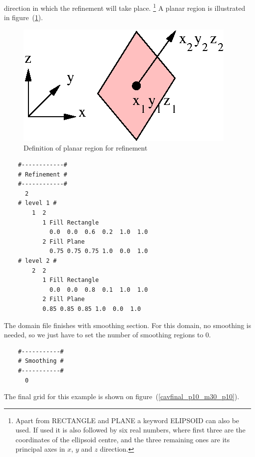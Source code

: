 \documentclass[10pt]{article}
\newcommand*{\tc}{\ttfamily} %
\begin{document}
    direction in which the refinement will take place. 
      \footnote{Apart from {\tc RECTANGLE} and {\tc PLANE} a keyword
      {\tc ELIPSOID} can also be used. If used it is also followed
      by six real numbers, where first three are the coordinates 
      of the ellipsoid centre, and the three remaining ones are 
      its principal axes in $x$, $y$ and $z$ direction.} 
    A planar region is illustrated in figure~(\ref{plane}).
    \begin{figure}
    \centering
    \includegraphics[scale=0.8]{plane.eps}
    \caption{Definition of planar region for refinement}
    \label{plane}
    \end{figure}
    \small
    \begin{verbatim}
    #------------#
    # Refinement #
    #------------#
      2
    # level 1 #
        1  2
           1 Fill Rectangle
             0.0  0.0  0.6  0.2  1.0  1.0
           2 Fill Plane
             0.75 0.75 0.75 1.0  0.0  1.0
    # level 2 #
        2  2
           1 Fill Rectangle
             0.0  0.0  0.8  0.1  1.0  1.0
           2 Fill Plane
           0.85 0.85 0.85 1.0  0.0  1.0
    \end{verbatim}
    \normalsize
    The domain file finishes with smoothing section. For this
    domain, no smoothing is needed, so we just have to set 
    the number of smoothing regions to 0.
    \small
    \begin{verbatim}
    #-----------#
    # Smoothing #  
    #-----------#
      0
    \end{verbatim}
    \normalsize
    The final grid for this example is shown on figure~(\ref{cavfinal_p10_m30_p10}).
\end{document}

